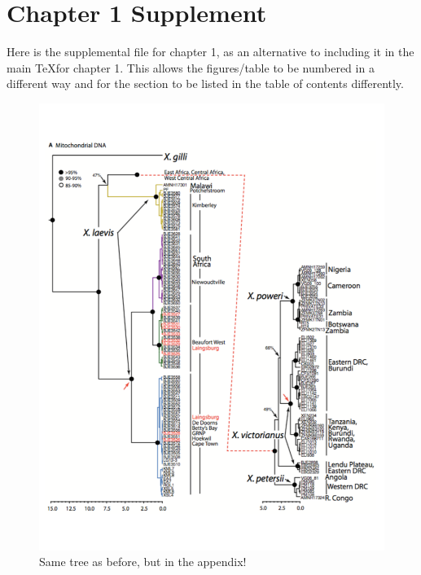 \chapter{Chapter 1 Supplement} %

\label{Supp_chap1} %


Here is the supplemental file for chapter 1, as an alternative to including it in the main \TeX for chapter 1. This allows the figures/table to be numbered in a different way and for the section to be listed in the table of contents differently. 


\begin{figure}[h] %
	\centering
	\includegraphics[scale=0.6]{Figs/Tree_Fig.pdf}
    \caption[Same Tree]{Same tree as before, but in the appendix!}
    \label{Another_tree}
\end{figure}
